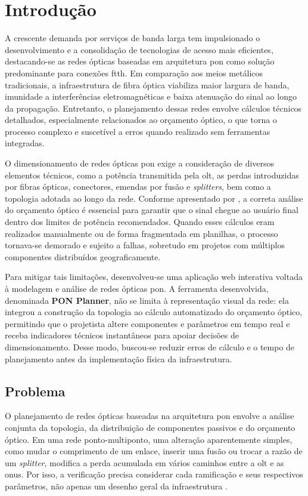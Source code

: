 \chapter{Introdução} 

A crescente demanda por serviços de banda larga tem impulsionado o desenvolvimento e a consolidação de tecnologias de acesso mais eficientes, destacando-se as redes ópticas baseadas em arquitetura \gls{pon} como solução predominante para conexões \gls{ftth}. Em comparação aos meios metálicos tradicionais, a infraestrutura de fibra óptica viabiliza maior largura de banda, imunidade a interferências eletromagnéticas e baixa atenuação do sinal ao longo da propagação. Entretanto, o planejamento dessas redes envolve cálculos técnicos detalhados, especialmente relacionados ao orçamento óptico, o que torna o processo complexo e suscetível a erros quando realizado sem ferramentas integradas.

O dimensionamento de redes ópticas \gls{pon} exige a consideração de diversos elementos técnicos, como a potência transmitida pela \gls{olt}, as perdas introduzidas por fibras ópticas, conectores, emendas por fusão e \textit{splitters}, bem como a topologia adotada ao longo da rede. Conforme apresentado por , a correta análise do orçamento óptico é essencial para garantir que o sinal chegue ao usuário final dentro dos limites de potência recomendados. Quando esses cálculos eram realizados manualmente ou de forma fragmentada em planilhas, o processo tornava-se demorado e sujeito a falhas, sobretudo em projetos com múltiplos componentes distribuídos geograficamente.

Para mitigar tais limitações, desenvolveu-se uma aplicação web interativa voltada à modelagem e análise de redes ópticas \gls{pon}. A ferramenta desenvolvida, denominada \textbf{PON Planner}, não se limita à representação visual da rede: ela integrou a construção da topologia ao cálculo automatizado do orçamento óptico, permitindo que o projetista altere componentes e parâmetros em tempo real e receba indicadores técnicos instantâneos para apoiar decisões de dimensionamento. Desse modo, buscou-se reduzir erros de cálculo e o tempo de planejamento antes da implementação física da infraestrutura.

\section{Problema}

O planejamento de redes ópticas baseadas na arquitetura \gls{pon} envolve a análise conjunta da topologia, da distribuição de componentes passivos e do orçamento óptico. Em uma rede ponto-multiponto, uma alteração aparentemente simples, como mudar o comprimento de um enlace, inserir uma fusão ou trocar a razão de um \textit{splitter}, modifica a perda acumulada em vários caminhos entre a \gls{olt} e as \glspl{onu}. Por isso, a verificação precisa considerar cada ramificação e seus respectivos parâmetros, não apenas um desenho geral da infraestrutura .

